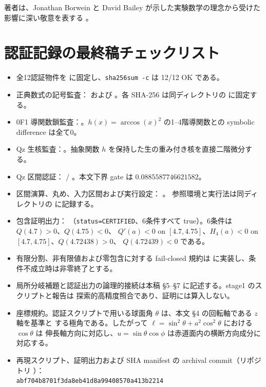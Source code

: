 \documentclass[a4paper,11pt]{ltjsarticle}
\theoremstyle{plain}
\theoremstyle{definition}
\begin{document}
著者は、Jonathan Borwein と David Bailey が示した実験数学の理念から受けた影響に深い敬意を表する
\cite{BorweinBailey}。

\appendix

\section{認証記録の最終稿チェックリスト}

\begin{itemize}
\item 全12認証物件を  に固定し、\texttt{sha256sum -c} は 12/12 OK である。\par
\item 正典数式の記号監査：
      および 。各 SHA-256 は同ディレクトリの
       に固定する。
\item 0F1 導関数鎖監査：。\(h(x)=\arccos(x)^2\) の1--4階導関数との symbolic difference は全て0。
\item Qz 生核監査：。抽象関数 \(h\) を保持した生の重み付き核を直接二階微分する。
\item Qz 区間認証： / 。本文下界 gate は \(0.0885587746621582\)。
\item 区間演算、丸め、入力区間および実行設定：
      。
      参照環境と実行法は同ディレクトリの  に記録する。
\item 包含証明出力：
      （\texttt{status=CERTIFIED}、6条件すべて true）。6条件は \(Q(4.7)>0\)、\(Q(4.75)<0\)、
      \(Q'(a)<0\) on \([4.7,4.75]\)、\(H_4(a)<0\) on \([4.7,4.75]\)、\(Q(4.72438)>0\)、
      \(Q(4.72439)<0\) である。
\item 有限分割、非有限値および零包含に対する fail-closed 規約は
       に実装し、条件不成立時は非零終了とする。
\item 局所分岐補題と認証出力の論理的接続は本稿 §5–§7 に記述する。stage1 のスクリプトと報告は
      探索的高精度照合であり、証明には算入しない。
\item 座標規約。認証スクリプトで用いる球面角 \(\theta\) は、本文 §4 の回転軸である \(z\) 軸を基準と
      する極角である。したがって \(\ell=\sin^2\theta+a^2\cos^2\theta\) における \(\cos\theta\) は
      伸長軸方向に対応し、\(u=\sin\theta\cos\phi\) は赤道面内の横断方向成分に対応する。
\item 再現スクリプト、証明出力および SHA manifest の archival commit（リポジトリ \cite{Repo}）：\\
      \texttt{abf704b8701f3da8eb41d8a99408570a413b2214}
\end{itemize}
\end{document}
